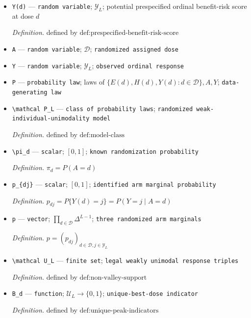 \documentclass{article}
\begin{document}
\begin{itemize}
  \item \texttt{Y(d)} --- \texttt{random variable}; \(\mathcal Y_L\); potential prespecified ordinal benefit-risk score at dose \(d\)
  \par\smallskip\noindent\emph{Definition.} defined by \(\text{def:prespecified-benefit-risk-score}\)
  \item \texttt{A} --- \texttt{random variable}; \(\mathcal D\); \texttt{randomized assigned dose}
  \item \texttt{Y} --- \texttt{random variable}; \(\mathcal Y_L\); \texttt{observed ordinal response}
  \item \texttt{P} --- \texttt{probability law}; laws of \(\{E(d),H(d),Y(d):d\in\mathcal D\},A,Y\); \texttt{data-\allowbreak{}generating law}
  \item \texttt{\textbackslash{}\allowbreak{}mathcal P\_\allowbreak{}L} --- \texttt{class of probability laws}; \texttt{randomized weak-\allowbreak{}individual-\allowbreak{}unimodality model}
  \par\smallskip\noindent\emph{Definition.} defined by \(\text{def:model-class}\)
  \item \texttt{\textbackslash{}\allowbreak{}pi\_\allowbreak{}d} --- \texttt{scalar}; \([0,1]\); \texttt{known randomization probability}
  \par\smallskip\noindent\emph{Definition.} \(\pi_d=P(A=d)\)
  \item \texttt{p\_\allowbreak{}\{dj\}\allowbreak{}} --- \texttt{scalar}; \([0,1]\); \texttt{identified arm marginal probability}
  \par\smallskip\noindent\emph{Definition.} \(p_{dj}=P\{Y(d)=j\}=P(Y=j\mid A=d)\)
  \item \texttt{p} --- \texttt{vector}; \(\prod_{d\in\mathcal D}\Delta^{L-1}\); \texttt{three randomized arm marginals}
  \par\smallskip\noindent\emph{Definition.} \(p=(p_{dj})_{d\in\mathcal D,j\in\mathcal Y_L}\)
  \item \texttt{\textbackslash{}\allowbreak{}mathcal U\_\allowbreak{}L} --- \texttt{finite set}; \texttt{legal weakly unimodal response triples}
  \par\smallskip\noindent\emph{Definition.} defined by \(\text{def:non-valley-support}\)
  \item \texttt{B\_\allowbreak{}d} --- \texttt{function}; \(\mathcal U_L\to\{0,1\}\); \texttt{unique-\allowbreak{}best-\allowbreak{}dose indicator}
  \par\smallskip\noindent\emph{Definition.} defined by \(\text{def:unique-peak-indicators}\)

\end{itemize}
\end{document}
